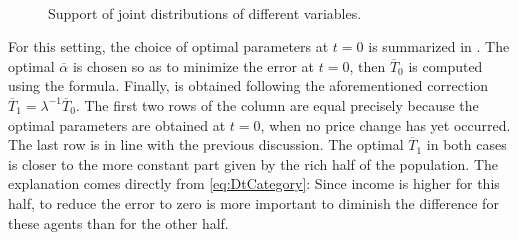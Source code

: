 \documentclass[english, a4paper,12pt]{article}
\begin{document}
	\begin{figure}[H]
		\caption{Support of joint distributions of different variables.}
		\label{fig:JointDistribsCategory}
		
		
		\,
		
	\end{figure}
For this setting, the choice of optimal parameters at $t = 0$ is summarized in . The optimal $\overline{\alpha}$ is chosen so as to minimize the error at $t = 0$, then $\overline{T}_{0}$ is computed using the formula. Finally, is obtained following the aforementioned correction $\overline{T}_{1} = \lambda^{-1}\overline{T}_{0}$. The first two rows of the column are equal precisely because the optimal parameters are obtained at $t =0$, when no price change has yet occurred. The last row is in line with the previous discussion. The optimal $\overline{T}_{1}$ in both cases is closer to the more constant part given by the rich half of the population. The explanation comes directly from \eqref{eq:DtCategory}: Since income is higher for this half, to reduce the error to zero is more important to diminish the difference for these agents than for the other half. 
\end{document}
